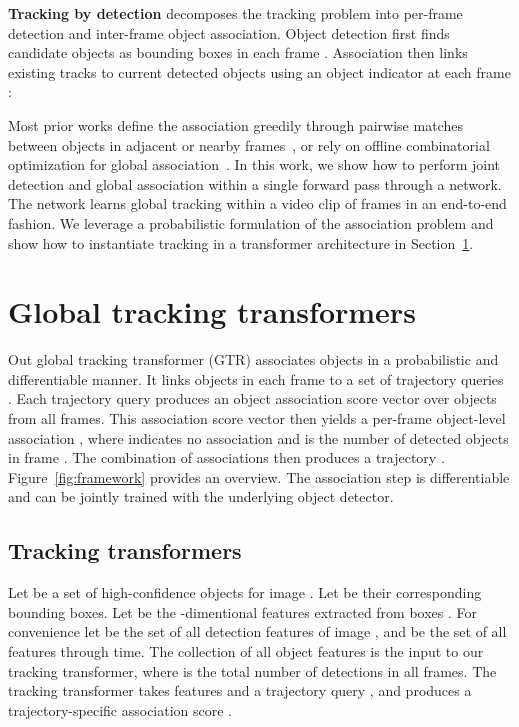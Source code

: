 \documentclass[10pt,twocolumn,letterpaper]{article}
\renewcommand{\paragraph}[1]{\noindent\textbf{#1}}
\let\oldsubsection\subsection
\renewcommand{\subsection}[1]{\vspace{-1mm}\oldsubsection{#1}\vspace{-1mm}}
\newcommand{\reffig}[1]{Figure~\ref{fig:#1}}
\newcommand{\refsec}[1]{Section~\ref{sec:#1}}
\newcommand{\lblsec}[1]{\label{sec:#1}}
\begin{document}
\paragraph{Tracking by detection} decomposes the tracking problem into per-frame detection and inter-frame object association.
Object detection first finds  candidate objects  as bounding boxes  in each frame .
Association then links existing tracks  to current detected objects using an object indicator  at each frame  :


Most prior works define the association greedily through pairwise matches between objects in adjacent or nearby frames~\cite{Bewley2016_sort,bergmann2019tracking,zhou2020tracking,zhang2020fair}, or rely on offline combinatorial optimization for global association~\cite{zhang2008global,braso2020learning,frossard2018end}.
In this work, we show how to perform joint detection and global association within a single forward pass through a network.
The network learns global tracking within a video clip of  frames in an end-to-end fashion.
We leverage a probabilistic formulation of the association problem and show how to instantiate tracking in a transformer architecture in \refsec{main}.

\section{Global tracking transformers}
\lblsec{main}
Out global tracking transformer (GTR) associates objects in a probabilistic and differentiable manner.
It links objects  in each frame  to a set of trajectory queries .
Each trajectory query  produces an object association score vector  over objects from all frames.
This association score vector then yields a per-frame object-level association , where  indicates no association and  is the number of detected objects in frame .
The combination of associations then produces a trajectory .
\reffig{framework} provides an overview.
The association step is differentiable and can be jointly trained with the underlying object detector.


\subsection{Tracking transformers}
Let  be a set of high-confidence objects for image .
Let  be their corresponding bounding boxes.
Let  be the -dimentional features
extracted from boxes .
For convenience let  be the set of all detection features of image , and  be the set of all features through time.
The collection of all object features  is the input to our tracking transformer, where  is the total number of detections in all frames.
The tracking transformer takes features  and a trajectory query , and produces a trajectory-specific association score .
\end{document}
